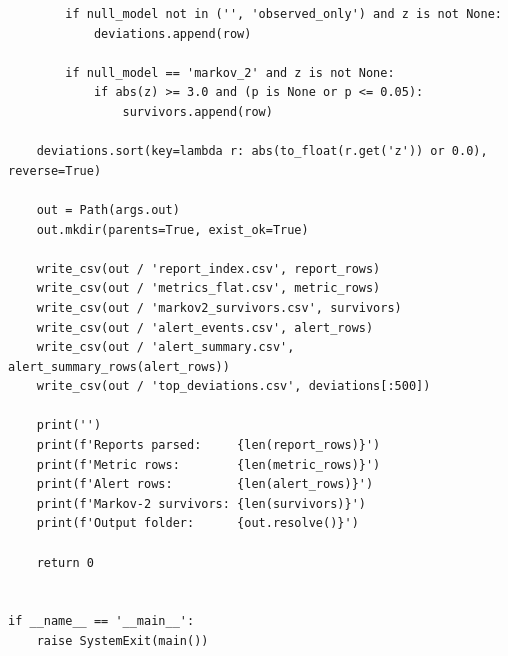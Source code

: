 \documentclass[11pt,a4paper]{article}
\begin{document}
\begin{lstlisting}
        if null_model not in ('', 'observed_only') and z is not None:
            deviations.append(row)

        if null_model == 'markov_2' and z is not None:
            if abs(z) >= 3.0 and (p is None or p <= 0.05):
                survivors.append(row)

    deviations.sort(key=lambda r: abs(to_float(r.get('z')) or 0.0), reverse=True)

    out = Path(args.out)
    out.mkdir(parents=True, exist_ok=True)

    write_csv(out / 'report_index.csv', report_rows)
    write_csv(out / 'metrics_flat.csv', metric_rows)
    write_csv(out / 'markov2_survivors.csv', survivors)
    write_csv(out / 'alert_events.csv', alert_rows)
    write_csv(out / 'alert_summary.csv', alert_summary_rows(alert_rows))
    write_csv(out / 'top_deviations.csv', deviations[:500])

    print('')
    print(f'Reports parsed:     {len(report_rows)}')
    print(f'Metric rows:        {len(metric_rows)}')
    print(f'Alert rows:         {len(alert_rows)}')
    print(f'Markov-2 survivors: {len(survivors)}')
    print(f'Output folder:      {out.resolve()}')

    return 0


if __name__ == '__main__':
    raise SystemExit(main())
\end{lstlisting}
\end{document}

